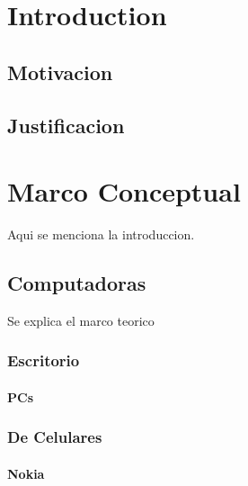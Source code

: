 \documentclass[12pt]{book}
\begin{document}
\tableofcontents
\chapter{Introduction}
\section{Motivacion}
\section{Justificacion}
\chapter{Marco Conceptual} 
Aqui se menciona la introduccion.
\section{Computadoras} 
Se explica el marco teorico
\subsection{Escritorio}
\subsubsection{PCs}
\subsection{De Celulares}
\subsubsection{Nokia}
\end{document}
